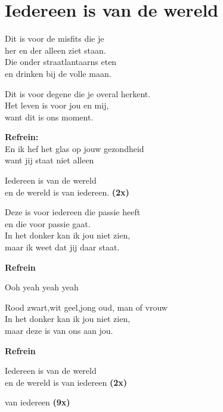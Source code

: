 \section{Iedereen is van de wereld}

Dit is voor de misfits die je \\
her en der alleen ziet staan.\\
Die onder straatlantaarns eten \\
en drinken bij de volle maan. 

Dit is voor degene die je overal herkent. \\
Het leven is voor jou en mij, \\
want dit is ons moment.

\textbf{Refrein:}\\
En ik hef het glas op jouw gezondheid\\
want jij staat niet alleen 

Iedereen is van de wereld \\
en de wereld is van iedereen. \textbf{(2x)}

Deze is voor iedereen die passie heeft \\
en die voor passie gaat. \\
In het donker kan ik jou niet zien,\\
maar ik weet dat jij daar staat. 

\textbf{Refrein}

Ooh yeah yeah yeah 

Rood zwart,wit geel,jong oud, man of vrouw \\
In het donker kan ik jou niet zien, \\
maar deze is van ons aan jou.

\textbf{Refrein}

Iedereen is van de wereld \\
en de wereld is van iedereen \textbf{(2x)}

van iedereen \textbf{(9x)}
